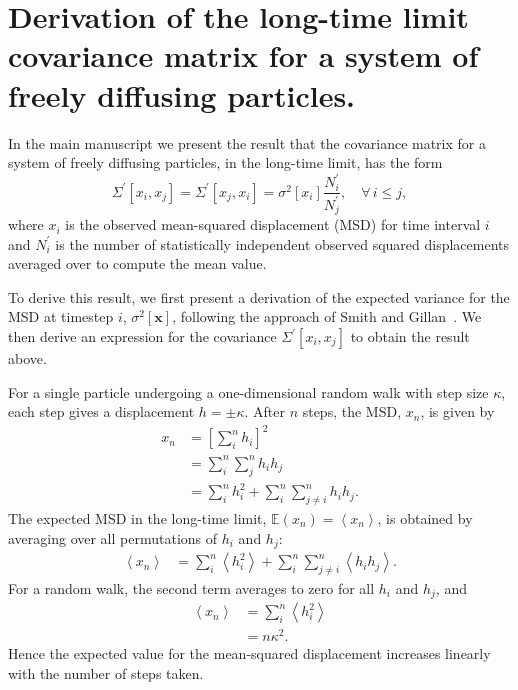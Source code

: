 \documentclass[reprint,superscriptaddress,nobibnotes,amsmath,amssymb,aps,prx,hidelinks]{revtex4-2}
\newcommand{\oMSD}{\ensuremath{\bm{x}}}
\newcommand{\oMSDi}{\ensuremath{x_i}}
\newcommand{\oMSDj}{\ensuremath{x_j}}
\newcommand{\oMSDn}{\ensuremath{x_n}}
\newcommand{\moMSDn}{\ensuremath{\left<\oMSDn\right>}}
\newcommand{\nind}[1]{\ensuremath{N^\prime_{#1}}}
\newcommand{\var}[1]{\ensuremath{\sigma^2[#1]}}
\begin{document}
\twocolumngrid

\section{Derivation of the long-time limit covariance matrix for a system of freely diffusing particles.}
\label{sec:ran}
In the main manuscript we present the result that the covariance matrix for a system of freely diffusing particles, in the long-time limit, has the form
\begin{equation}
  \Sigma^\prime\left[\oMSDi, \oMSDj\right]= \Sigma^\prime\left[\oMSDj, \oMSDi\right] =
  \var{\oMSDi} \frac{\nind{i}}{\nind{j}},\hspace{1em} \forall\,i \leq j,
  \label{equ:cvv_SI}
\end{equation}
where $\oMSDi$ is the observed mean-squared displacement (MSD) for time interval $i$ and $\nind{i}$ is the number of statistically independent observed squared displacements averaged over to compute the mean value.

To derive this result, we first present a derivation of the expected variance for the MSD at timestep $i$, $\var{\oMSD}$, following the approach of Smith and Gillan~\cite{smith_random_1996}.
We then derive an expression for the covariance $\Sigma^\prime\left[\oMSDi, \oMSDj\right]$ to obtain the result above.

For a single particle undergoing a one-dimensional random walk with step size $\kappa$, each step gives a displacement $h = \pm \kappa$.
After $n$ steps, the MSD, $\oMSDn$, is given by
\begin{equation}
  \begin{aligned}
    \oMSDn &= \left[\sum_i^n h_i\right]^2\\
           &= \sum_i^n\sum_j^n h_i h_j \\
           &= \sum_i^n h_i^2 + \sum_i^n\sum_{j\neq i}^n h_ih_j.
  \end{aligned}
\end{equation}
The expected MSD in the long-time limit, $\mathbb{E}(\oMSDn) = \moMSDn$, is obtained by averaging over all permutations of $h_i$ and $h_j$:
\begin{equation}
  \begin{aligned}
    \moMSDn &= \sum_i^n \left<h_i^2\right> + \sum_i^n\sum_{j\neq i}^n\left<h_i h_j\right>.
  \end{aligned}
\end{equation}
For a random walk, the second term averages to zero for all $h_i$ and $h_j$, and
\begin{equation}
  \begin{aligned}
    \moMSDn &= \sum_i^n \left<h_i^2\right> \\
            &= n\kappa^2.
  \end{aligned}
  \label{equ:msd_SI}
\end{equation}
Hence the expected value for the mean-squared displacement increases linearly with the number of steps taken.
\end{document}
